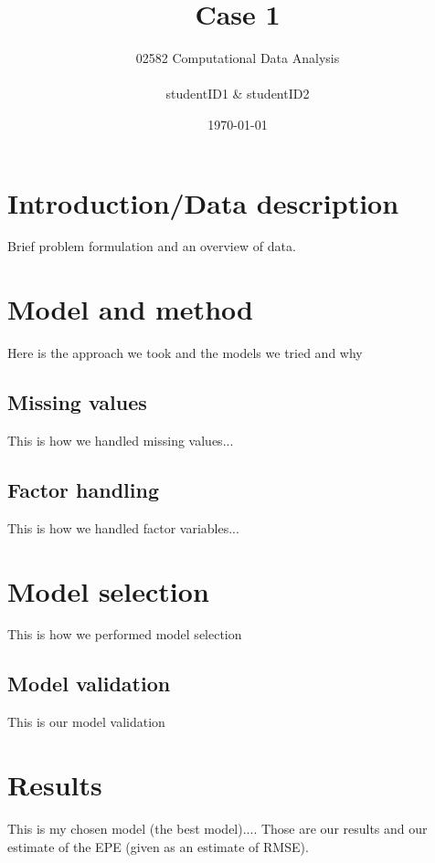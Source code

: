 \documentclass{article}
\title{Case 1}
\author{02582 Computational Data Analysis \\ \\ studentID1 \& studentID2}
\date{\today}
\begin{document}
\maketitle
\section*{Introduction/Data description}
Brief problem formulation and an overview of data.
\section*{Model and method}
Here is the approach we took and the models we tried and why
\subsection*{Missing values}
This is how we handled missing values...
\subsection*{Factor handling}
This is how we handled factor variables...
\section*{Model selection}
This is how we performed model selection
\subsection*{Model validation}
This is our model validation
\section*{Results}
This is my chosen model (the best model)....
Those are our results and our estimate of the EPE (given as
an estimate of RMSE).
\end{document}
